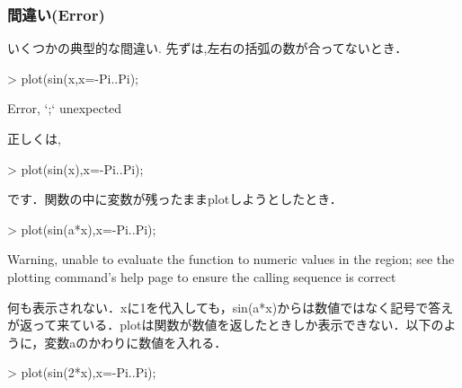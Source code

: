 \subsubsection{間違い(Error)}
いくつかの典型的な間違い.
先ずは,左右の括弧の数が合ってないとき．
\begin{MapleInput}
> plot(sin(x,x=-Pi..Pi);
\end{MapleInput}
\begin{MapleError}
Error, `;` unexpected
\end{MapleError}
正しくは,
\begin{MapleInput}
> plot(sin(x),x=-Pi..Pi);
\end{MapleInput}
です．関数の中に変数が残ったままplotしようとしたとき．
\begin{MapleInput}
> plot(sin(a*x),x=-Pi..Pi);
\end{MapleInput}
\begin{MapleError}
Warning, unable to evaluate the function to numeric values in the region; see
the plotting command's help page to ensure the calling sequence is correct
\end{MapleError}
何も表示されない．xに1を代入しても，sin(a*x)からは数値ではなく記号で答えが返って来ている．plotは関数が数値を返したときしか表示できない．以下のように，変数aのかわりに数値を入れる．
\begin{MapleInput}
> plot(sin(2*x),x=-Pi..Pi);
\end{MapleInput}


